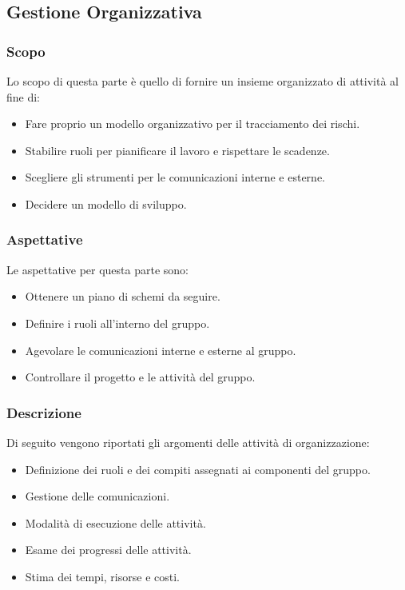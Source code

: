 \subsection{Gestione Organizzativa}
\subsubsection{Scopo}
Lo scopo di questa parte è quello di fornire un insieme organizzato di attività al fine di:
\begin{itemize}
    \item Fare proprio un modello organizzativo per il tracciamento dei rischi.
    \item Stabilire ruoli per pianificare il lavoro e rispettare le scadenze.
    \item Scegliere gli strumenti per le comunicazioni interne e esterne.
    \item Decidere un modello di sviluppo.
\end{itemize}

\subsubsection{Aspettative}
Le aspettative per questa parte sono:
\begin{itemize}
    \item Ottenere un piano di schemi da seguire.
    \item Definire i ruoli all'interno del gruppo.
    \item Agevolare le comunicazioni interne e esterne al gruppo.
    \item Controllare il progetto e le attività del gruppo.
\end{itemize}

\subsubsection{Descrizione}
Di seguito vengono riportati gli argomenti delle attività di organizzazione:
\begin{itemize}
    \item Definizione dei ruoli e dei compiti assegnati ai componenti del gruppo.
    \item Gestione delle comunicazioni.
    \item Modalità di esecuzione delle attività.
    \item Esame dei progressi delle attività.
    \item Stima dei tempi, risorse e costi.
\end{itemize}

